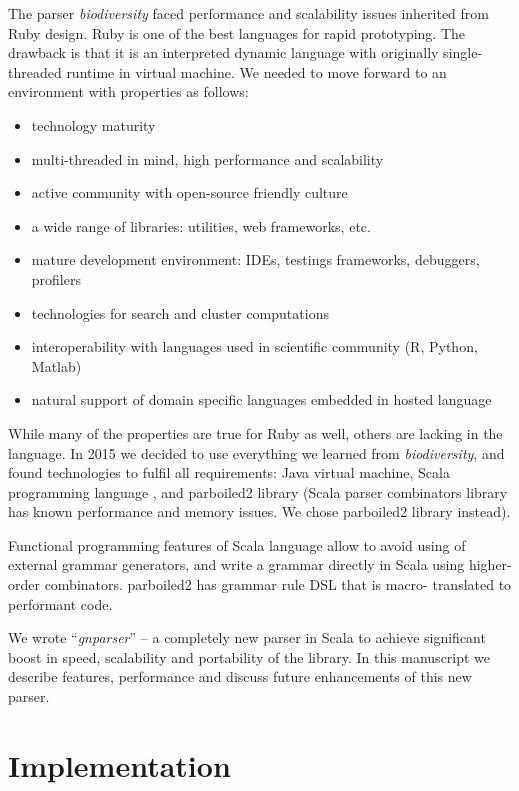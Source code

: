 \documentclass{bmcart}
\begin{document}
The parser \textit{biodiversity} faced performance and scalability issues
inherited from Ruby design. Ruby is one of the best languages for rapid
prototyping. The drawback is that it is an interpreted dynamic language with
originally single-threaded runtime in virtual machine. We needed to move
forward to an environment with properties as follows:

\begin{itemize}
    \item technology maturity
    \item multi-threaded in mind, high performance and scalability
    \item active community with open-source friendly culture
    \item a wide range of libraries: utilities, web frameworks, etc.
    \item mature development environment: IDEs, testings frameworks,
    debuggers, profilers
    \item technologies for search and cluster computations
    \item interoperability with languages used in scientific community (R,
    Python, Matlab)
    \item natural support of domain specific languages embedded in hosted
    language
\end{itemize}

While many of the properties are true for Ruby as well, others are lacking in
the language. In 2015 we decided to use everything we learned from
\textit{biodiversity}, and found technologies to fulfil all requirements: Java
virtual machine, Scala programming language \cite{odersky2004overview}, and
parboiled2 library \cite{parboiled2} (Scala parser combinators
\cite{moors2008parser} library has known performance and memory issues. We
chose parboiled2 library instead).

Functional programming features of Scala language allow to avoid using of
external grammar generators, and write a grammar directly in Scala using
higher-order combinators. parboiled2 has grammar rule DSL that is macro-
translated \cite{Burmako:2013:SML:2489837.2489840} to performant code.

We wrote ``\textit{gnparser}'' -- a completely new parser in Scala to achieve
significant boost in speed, scalability and portability of the library. In
this manuscript we describe features, performance and discuss future
enhancements of this new parser.

\section*{Implementation}
\end{document}
